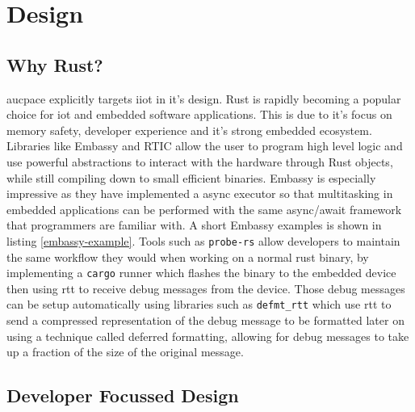 \chapter{Design}

\section{Why Rust?}
\label{sec:why-rust}

\gls{aucpace} explicitly targets \gls{iiot} in it's design.
Rust is rapidly becoming a popular choice for \gls{iot} and embedded software applications.
This is due to it's focus on memory safety, developer experience and it's strong embedded ecosystem.
Libraries like Embassy and RTIC allow the user to program high level logic and use powerful abstractions to interact with the hardware through Rust objects, while still compiling down to small efficient binaries.
Embassy is especially impressive as they have implemented a async executor so that multitasking in embedded applications can be performed with the same async/await framework that programmers are familiar with.
A short Embassy examples is shown in listing \ref{embassy-example}.
Tools such as \texttt{probe-rs} allow developers to maintain the same workflow they would when working on a normal rust binary, by implementing a \texttt{cargo} runner which flashes the binary to the embedded device then using \gls{rtt} to receive debug messages from the device.
Those debug messages can be setup automatically using libraries such as \texttt{defmt\_rtt} which use \gls{rtt} to send a compressed representation of the debug message to be formatted later on using a technique called deferred formatting, allowing for debug messages to take up a fraction of the size of the original message.


\section{Developer Focussed Design}

